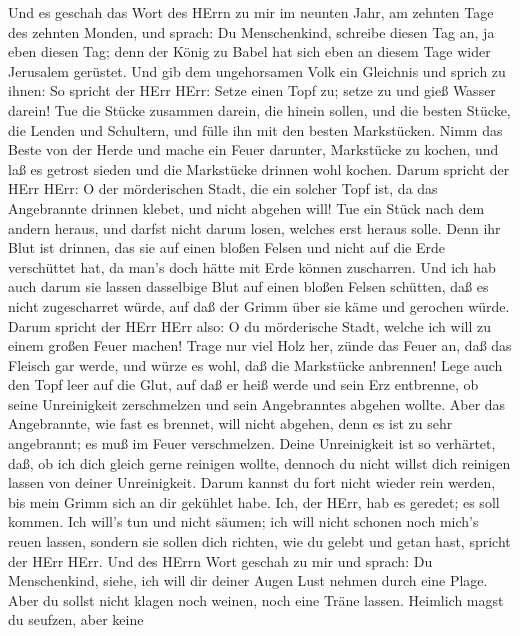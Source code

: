  Und es geschah das Wort des HErrn zu mir im neunten Jahr,
am zehnten Tage des zehnten Monden, und sprach:  Du
Menschenkind, schreibe diesen Tag an, ja eben diesen Tag; denn der König
zu Babel hat sich eben an diesem Tage wider Jerusalem gerüstet.
 Und gib dem ungehorsamen Volk ein Gleichnis und sprich zu
ihnen: So spricht der HErr HErr: Setze einen Topf zu; setze zu und gieß
Wasser darein!  Tue die Stücke zusammen darein, die hinein
sollen, und die besten Stücke, die Lenden und Schultern, und fülle ihn
mit den besten Markstücken.  Nimm das Beste von der Herde
und mache ein Feuer darunter, Markstücke zu kochen, und laß es getrost
sieden und die Markstücke drinnen wohl kochen.  Darum
spricht der HErr HErr: O der mörderischen Stadt, die ein solcher Topf
ist, da das Angebrannte drinnen klebet, und nicht abgehen will! Tue ein
Stück nach dem andern heraus, und darfst nicht darum losen, welches erst
heraus solle.  Denn ihr Blut ist drinnen, das sie auf einen
bloßen Felsen und nicht auf die Erde verschüttet hat, da man's doch
hätte mit Erde können zuscharren.  Und ich hab auch darum
sie lassen dasselbige Blut auf einen bloßen Felsen schütten, daß es
nicht zugescharret würde, auf daß der Grimm über sie käme und gerochen
würde.  Darum spricht der HErr HErr also: O du mörderische
Stadt, welche ich will zu einem großen Feuer machen!  Trage
nur viel Holz her, zünde das Feuer an, daß das Fleisch gar werde, und
würze es wohl, daß die Markstücke anbrennen!  Lege auch den
Topf leer auf die Glut, auf daß er heiß werde und sein Erz entbrenne, ob
seine Unreinigkeit zerschmelzen und sein Angebranntes abgehen wollte.
 Aber das Angebrannte, wie fast es brennet, will nicht
abgehen, denn es ist zu sehr angebrannt; es muß im Feuer verschmelzen.
 Deine Unreinigkeit ist so verhärtet, daß, ob ich dich
gleich gerne reinigen wollte, dennoch du nicht willst dich reinigen
lassen von deiner Unreinigkeit. Darum kannst du fort nicht wieder rein
werden, bis mein Grimm sich an dir gekühlet habe.  Ich, der
HErr, hab es geredet; es soll kommen. Ich will's tun und nicht säumen;
ich will nicht schonen noch mich's reuen lassen, sondern sie sollen dich
richten, wie du gelebt und getan hast, spricht der HErr HErr.
 Und des HErrn Wort geschah zu mir und sprach:
 Du Menschenkind, siehe, ich will dir deiner Augen Lust
nehmen durch eine Plage. Aber du sollst nicht klagen noch weinen, noch
eine Träne lassen.  Heimlich magst du seufzen, aber keine

